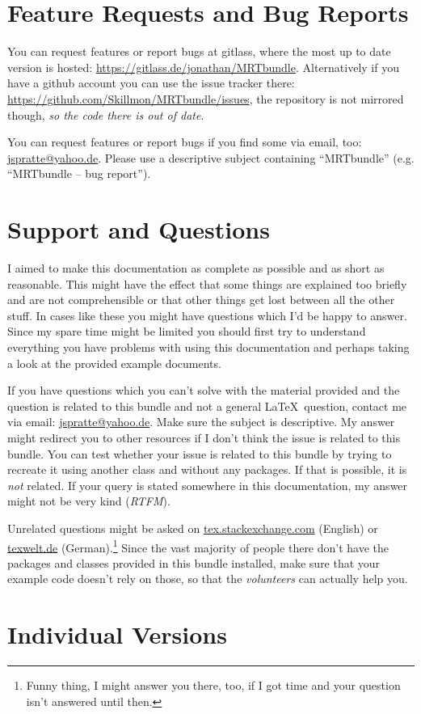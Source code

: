 \section{Feature Requests and Bug Reports}\label{sec:bugs}
You can request features or report bugs at gitlass, where the most up to date
version is hosted:
\url{https://gitlass.de/jonathan/MRTbundle}. Alternatively if you have a github
account you can use the issue tracker there:
\url{https://github.com/Skillmon/MRTbundle/issues}, the repository is not
mirrored though, \emph{so the code there is out of date}.

You can request features or report bugs if you find some via
email, too:
\href{mailto:jspratte@yahoo.de?subject=MRTbundle -- bug report}
  {jspratte@yahoo.de}.
Please use a descriptive subject containing ``MRTbundle'' (e.g. ``MRTbundle --
bug report'').

\section{Support and Questions}
I aimed to make this documentation as complete as possible and as short as
reasonable. This might have the effect that some things are explained too
briefly and are not comprehensible or that other things get lost between all the
other stuff. In cases like these you might have questions which I'd be happy to
answer. Since my spare time might be limited you should first try to understand
everything you have problems with using this documentation and perhaps taking a
look at the provided example documents.

If you have questions which you can't solve with the material provided and the
question is related to this bundle and not a general \LaTeX\ question, contact
me via email:
\href{mailto:jspratte@yahoo.de?subject=MRTbundle -- support}
  {jspratte@yahoo.de}.
Make sure the subject is descriptive. My answer might redirect you to other
resources if I don't think the issue is related to this bundle. You can test
whether your issue is related to this bundle by trying to recreate it using
another class and without any  packages. If that is possible, it is
\emph{not} related. If your query is stated somewhere in this documentation, my
answer might not be very kind (\!\emph{RTFM}).

Unrelated questions might be asked on \url{tex.stackexchange.com} (English) or
\url{texwelt.de} (German).\footnote{Funny thing, I might answer you there, too,
if I got time and your question isn't answered until then.} Since the vast
majority of people there don't have the packages and classes provided in this
bundle installed, make sure that your example code doesn't rely on those, so
that the \emph{volunteers} can actually help you.

\section{Individual Versions}
\docIndividualVersions
